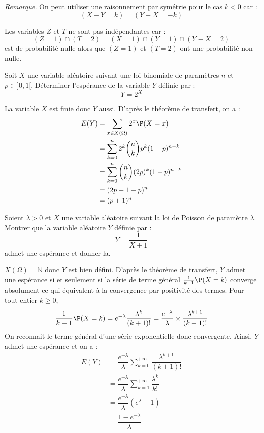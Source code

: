 \documentclass[a4paper,10pt]{report}
\begin{document}
\medskip

\noindent \textit{Remarque.} On peut utiliser une raisonnement par symétrie pour le cas $k <0$ car :
$$ (X-Y=k) = (Y-X=-k)$$

\medskip

\noindent Les variables $Z$ et $T$ ne sont pas indépendantes car :
$$ (Z=1) \cap (T=2) = (X =1) \cap (Y = 1) \cap (Y-X =2)$$
est de probabilité nulle alors que $(Z=1)$ et $(T=2)$ ont une probabilité non nulle.


\begin{Exercice}{} Soit $X$ une variable aléatoire suivant une loi binomiale de paramètres $n$ et $p \in ]0,1[$. Déterminer l'espérance de la variable $Y$ définie par :
  \[
  Y = 2^X
  \]
\end{Exercice}

\corr La variable $X$ est finie donc $Y$ aussi. D'après le théorème de transfert, on a :
\begin{align*}
E(Y) & = \sum_{x \in X(\Omega)} 2^x \P(X=x) \\
& = \sum_{k=0}^n 2^k \binom{n}{k} p^k (1-p)^{n-k} \\
& =  \sum_{k=0}^n \binom{n}{k} (2p)^k (1-p)^{n-k} \\
& = (2p+1-p)^n \\
& = (p+1)^n
\end{align*}

\begin{Exercice}{} Soient $\lambda >0$ et $X$ une variable aléatoire suivant la loi de Poisson de paramètre $\lambda$. Montrer que la variable aléatoire $Y$ définie par :
$$ Y = \frac{1}{X+1}$$
admet une espérance et donner la.
\end{Exercice}

\corr $X(\Omega)= \mathbb{N}$ donc $Y$ est bien défini. D'après le théorème de transfert, $Y$ admet une espérance si et seulement si la série de terme général $\tfrac{1}{k+1} \P(X=k)$ converge absolument ce qui équivalent à la convergence par positivité des termes. Pour tout entier $k \geq 0$,
$$ \dfrac{1}{k+1} \P(X=k) = e^{-\lambda} \dfrac{\lambda^k}{(k+1)!} = \dfrac{e^{-\lambda}}{\lambda} \times \dfrac{\lambda^{k+1}}{(k+1)!}$$
On reconnait le terme général d'une série exponentielle donc convergente. Ainsi, $Y$ admet une espérance et on a :
\begin{align*}
E(Y) & = \dfrac{e^{-\lambda}}{\lambda} \sum_{k=0}^{+ \infty}\dfrac{\lambda^{k+1}}{(k+1)!} \\
& = \dfrac{e^{-\lambda}}{\lambda} \sum_{k=1}^{+ \infty}\dfrac{\lambda^{k}}{k!} \\
& = \dfrac{e^{-\lambda}}{\lambda} (e^{\lambda}-1) \\
& = \dfrac{1- e^{-\lambda}}{\lambda}
\end{align*}
\end{document}

